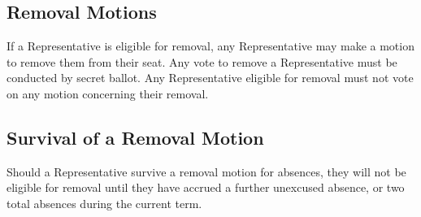 \subsection{Removal Motions}

If a Representative is eligible for removal, any Representative may make a motion to remove them from their seat. Any vote to remove a Representative must be conducted by secret ballot. Any Representative eligible for removal must not vote on any motion concerning their removal. 

\subsection{Survival of a Removal Motion}

Should a Representative survive a removal motion for absences, they will not be eligible for removal until they have accrued a further unexcused absence, or two total absences during the current term.
